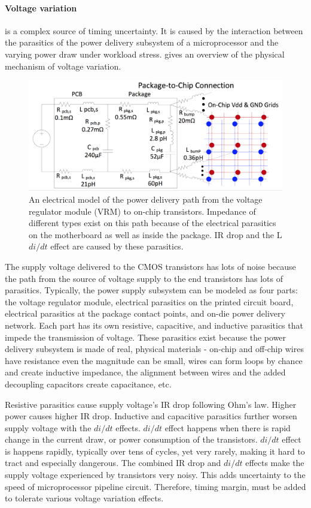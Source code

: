 \paragraph{Voltage variation} is a complex source of timing uncertainty. It is caused by the interaction between the parasitics of the power delivery subsystem of a microprocessor and the varying power draw under workload stress.  gives an overview of the physical mechanism of voltage variation.

\begin{figure}[t!]
  \centering
  \includegraphics[trim=0 0 0 0,clip,width=0.8\linewidth]{graphs/background/pdn-model.png}
  \caption{An electrical model of the power delivery path from the voltage regulator module (VRM) to on-chip transistors. Impedance of different types exist on this path because of the electrical parasitics on the motherboard as well as inside the package. IR drop and the L$di/dt$ effect are caused by these parasitics.}
  \label{fig:pdn-model}
\end{figure}

The supply voltage delivered to the CMOS transistors has lots of noise because the path from the source of voltage supply to the end transistors has lots of parasitics. Typically, the power supply subsystem can be modeled as four parts: the voltage regulator module, electrical parasitics on the printed circuit board, electrical parasitics at the package contact points, and on-die power delivery network. Each part has its own resistive, capacitive, and inductive parasitics that impede the transmission of voltage. These parasitics exist because the power delivery subsystem is made of real, physical materials - on-chip and off-chip wires have resistance even the magnitude can be small, wires can form loops by chance and create inductive impedance, the alignment between wires and the added decoupling capacitors create capacitance, etc.

Resistive parasitics cause supply voltage's IR drop following Ohm's law. Higher power causes higher IR drop. Inductive and capacitive parasitics further worsen supply voltage with the $di/dt$ effects. $di/dt$ effect happens when there is rapid change in the current draw, or power consumption of the transistors. $di/dt$ effect is happens rapidly, typically over tens of cycles, yet very rarely, making it hard to tract and especially dangerous. The combined IR drop and $di/dt$ effects make the supply voltage experienced by transistors very noisy. This adds uncertainty to the speed of microprocessor pipeline circuit. Therefore, timing margin, must be added to tolerate various voltage variation effects.

